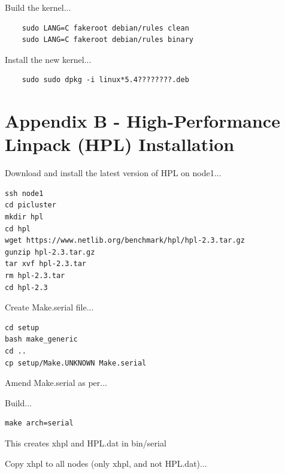 \documentclass{article}
\begin{document}
Build the kernel...

\begin{verbatim}
    sudo LANG=C fakeroot debian/rules clean
    sudo LANG=C fakeroot debian/rules binary
\end{verbatim}

Install the new kernel...

\begin{verbatim}
    sudo sudo dpkg -i linux*5.4????????.deb
\end{verbatim}






%
%
\clearpage\section*{Appendix B - High-Performance Linpack (HPL) Installation}

Download and install the latest version of HPL on node1...

\begin{lstlisting}[]
ssh node1
cd picluster
mkdir hpl
cd hpl
wget https://www.netlib.org/benchmark/hpl/hpl-2.3.tar.gz
gunzip hpl-2.3.tar.gz
tar xvf hpl-2.3.tar
rm hpl-2.3.tar
cd hpl-2.3
\end{lstlisting}

Create Make.serial file...

\begin{lstlisting}[]
cd setup
bash make_generic
cd ..
cp setup/Make.UNKNOWN Make.serial
\end{lstlisting}

Amend Make.serial as per...

Build...

\begin{lstlisting}[]
make arch=serial   
\end{lstlisting}

This creates xhpl and HPL.dat in bin/serial

Copy xhpl to all nodes (only xhpl, and not HPL.dat)...
\end{document}
